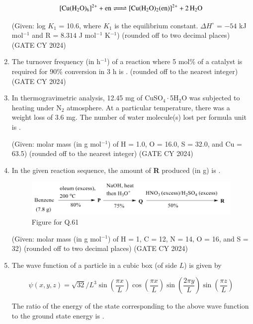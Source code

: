 \documentclass[12pt]{article}
\begin{document}
\begin{enumerate}
\[
\ce{[Cu(H2O)6]^{2+} + en <=> [Cu(H2O)2(en)]^{2+} + 2H2O}
\]

(Given: log $K_1$ = 10.6, where $K_1$ is the equilibrium constant. $\Delta H^\circ$ = $-54$ kJ mol$^{-1}$ and R = $8.314$ J mol$^{-1}$ K$^{-1}$)
 (rounded off to two decimal places)
\hfill (GATE CY 2024)

\item The turnover frequency (in h$^{-1}$) of a reaction where 5 mol\% of a catalyst is required for 90\% conversion in 3 h is \underline{\hspace{2cm}}.
 (rounded off to the nearest integer)
\hfill (GATE CY 2024)

\item In thermogravimetric analysis, 12.45 mg of CuSO$_4\cdot$5H$_2$O was subjected to heating under N$_2$ atmosphere. At a particular temperature, there was a weight loss of 3.6 mg. The number of water molecule(s) lost per formula unit is \underline{\hspace{2cm}}.

(Given: molar mass (in g mol$^{-1}$) of H = 1.0, O = 16.0, S = 32.0, and Cu = 63.5)
 (rounded off to the nearest integer)
\hfill (GATE CY 2024)

\item In the given reaction sequence, the amount of \textbf{R} produced (in g) is \underline{\hspace{2cm}}.
\begin{figure}[H]
\centering
\includegraphics[width=0.6\columnwidth]{figs/q61.png}
\caption{Figure for Q.61}
\label{fig:q61}
\end{figure}
(Given: molar mass (in g mol$^{-1}$) of H = 1, C = 12, N = 14, O = 16, and S = 32)
(rounded off to two decimal places)
\hfill (GATE CY 2024)

\item The wave function of a particle in a cubic box (of side $L$) is given by

\[
\psi(x, y, z) = \sqrt{32}/L^3 \sin\left(\frac{\pi x}{L}\right) \cos\left(\frac{\pi x}{L}\right) \sin\left(\frac{2\pi y}{L}\right) \sin\left(\frac{\pi z}{L}\right)
\]

The ratio of the energy of the state corresponding to the above wave function to the ground state energy is \underline{\hspace{2cm}}.


\end{enumerate}
\end{document}
